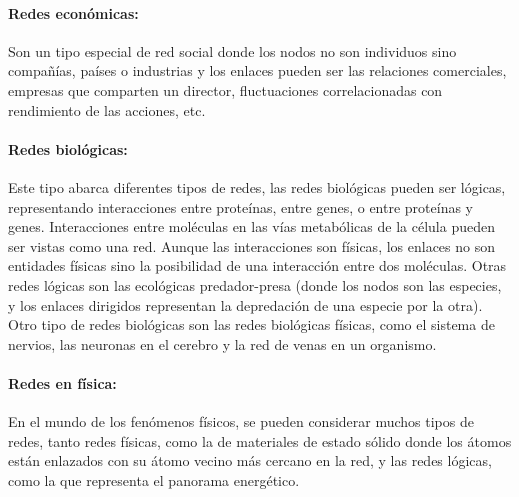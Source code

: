 \paragraph{Redes económicas:} Son un tipo especial de red social donde los nodos no son individuos sino compañías, países o industrias y los enlaces pueden ser las relaciones comerciales, empresas que comparten un director, fluctuaciones correlacionadas con rendimiento de las acciones, etc.
 
\paragraph{Redes biológicas:}Este tipo abarca diferentes tipos de redes, las redes biológicas pueden ser lógicas, representando interacciones entre proteínas, entre genes, o entre proteínas y genes. Interacciones entre moléculas en las vías metabólicas de la célula pueden ser vistas como una red. Aunque las interacciones son físicas, los enlaces no son entidades físicas sino la posibilidad de una interacción entre dos moléculas. Otras redes lógicas son las ecológicas predador-presa (donde los nodos son las especies, y los enlaces dirigidos representan la depredación de una especie por la otra). Otro tipo de redes biológicas son las redes biológicas físicas, como el sistema de nervios, las neuronas en el cerebro y la red de venas en un organismo.
 
\paragraph{Redes en física:} En el mundo de los fenómenos físicos, se pueden considerar muchos tipos de redes, tanto redes físicas, como la de materiales de estado sólido donde los átomos están enlazados con su átomo vecino más cercano en la red, y las redes lógicas, como la que representa el panorama energético.

